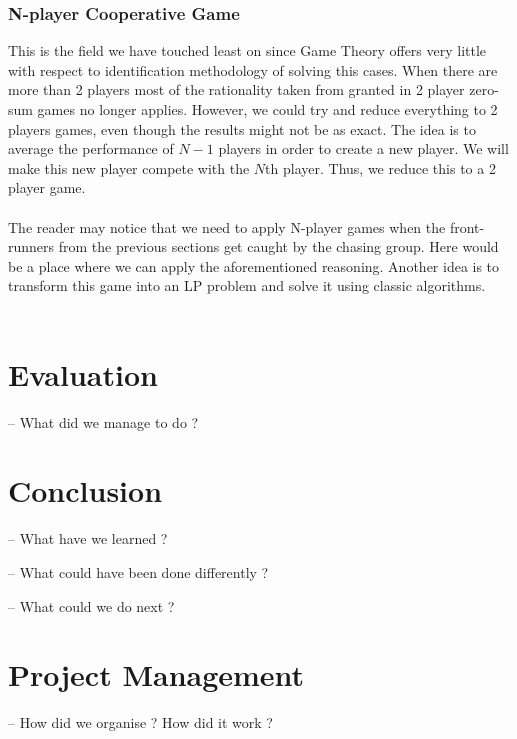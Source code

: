 \documentclass[10pt, a4paper]{report}
\begin{document}
\subsection{N-player Cooperative Game}
This is the field we have touched least on since Game Theory offers very little with respect to identification methodology of solving this cases. When there are more than 2 players most of the rationality taken from granted in 2 player zero-sum games no longer applies. However, we could try and reduce everything to 2 players games, even though the results might not be as exact. The idea is to average the performance of $N-1$ players in order to create a new player. We will make this new player compete with the $N$th player. Thus, we reduce this to a 2 player game.\\\\
The reader may notice that we need to apply N-player games when the front-runners from the previous sections get caught by the chasing group. Here would be a place where we can apply the aforementioned reasoning. Another idea is to transform this game into an LP problem and solve it using classic algorithms.
\\\\


\chapter{Evaluation}

-- What did we manage to do ?

\chapter{Conclusion}

-- What have we learned ?

-- What could have been done differently ?

-- What could we do next ?

\chapter{Project Management}

-- How did we organise ? How did it work ?




\end{document}
